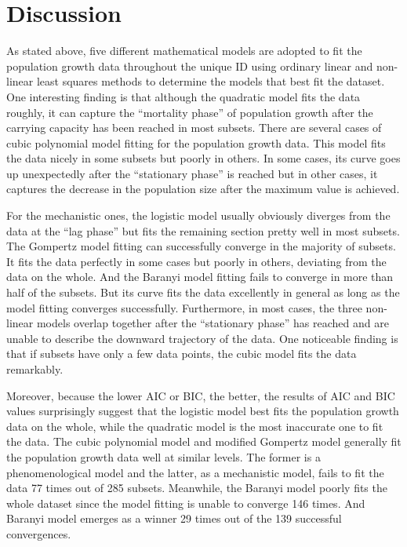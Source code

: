 \documentclass[11pt, a4paper]{article}
\begin{document}
\section{Discussion}
As stated above, five different mathematical models are adopted to fit the population growth data throughout the unique ID using ordinary linear and non-linear least squares methods to determine the models that best fit the dataset. One interesting finding is that although the quadratic model fits the data roughly, it can capture the “mortality phase” of population growth after the carrying capacity has been reached in most subsets. There are several cases of cubic polynomial model fitting for the population growth data. This model fits the data nicely in some subsets but poorly in others. In some cases, its curve goes up unexpectedly after the “stationary phase” is reached but in other cases, it captures the decrease in the population size after the maximum value is achieved. 

For the mechanistic ones, the logistic model usually obviously diverges from the data at the “lag phase” but fits the remaining section pretty well in most subsets. The Gompertz model fitting can successfully converge in the majority of subsets. It fits the data perfectly in some cases but poorly in others, deviating from the data on the whole. And the Baranyi model fitting fails to converge in more than half of the subsets. But its curve fits the data excellently in general as long as the model fitting converges successfully. Furthermore, in most cases, the three non-linear models overlap together after the “stationary phase” has reached and are unable to describe the downward trajectory of the data. One noticeable finding is that if subsets have only a few data points, the cubic model fits the data remarkably. 

Moreover, because the lower AIC or BIC, the better, the results of AIC and BIC values surprisingly suggest that the logistic model best fits the population growth data on the whole, while the quadratic model is the most inaccurate one to fit the data. The cubic polynomial model and modified Gompertz model generally fit the population growth data well at similar levels. The former is a phenomenological model and the latter, as a mechanistic model, fails to fit the data 77 times out of 285 subsets. Meanwhile, the Baranyi model poorly fits the whole dataset since the model fitting is unable to converge 146 times. And Baranyi model emerges as a winner 29 times out of the 139 successful convergences. 
\end{document}
